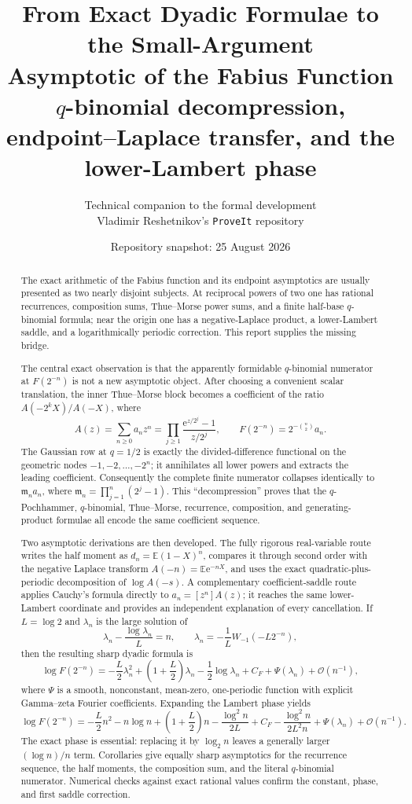 \documentclass[11pt,oneside]{article}
\title{\bfseries From Exact Dyadic Formulae to the Small-Argument\\
Asymptotic of the Fabius Function\\[0.35em]
\large $q$-binomial decompression, endpoint--Laplace transfer, and the lower-Lambert phase}
\author{Technical companion to the formal development\\
\small Vladimir Reshetnikov's \texttt{ProveIt} repository}
\date{Repository snapshot: 25 August 2026}
\theoremstyle{definition}
\theoremstyle{remark}
\newcommand{\e}{\mathrm e}
\newcommand{\E}{\mathbb E}
\newcommand{\bigO}{\mathcal O}
\newcommand{\M}{\mathfrak m}
\begin{document}
\maketitle

\begin{abstract}
The exact arithmetic of the Fabius function and its endpoint asymptotics are usually presented
as two nearly disjoint subjects.  At reciprocal powers of two one has rational recurrences,
composition sums, Thue--Morse power sums, and a finite half-base $q$-binomial formula; near the
origin one has a negative-Laplace product, a lower-Lambert saddle, and a logarithmically
periodic correction.  This report supplies the missing bridge.

The central exact observation is that the apparently formidable $q$-binomial numerator at
$F(2^{-n})$ is not a new asymptotic object.  After choosing a convenient scalar translation,
the inner Thue--Morse block becomes a coefficient of the ratio
$A(-2^kX)/A(-X)$, where
\[
 A(z)=\sum_{n\ge0}a_nz^n
     =\prod_{j\ge1}\frac{\e^{z/2^j}-1}{z/2^j},
 \qquad
 F(2^{-n})=2^{-\binom n2}a_n.
\]
The Gaussian row at $q=1/2$ is exactly the divided-difference functional on the geometric
nodes $-1,-2,\ldots,-2^n$; it annihilates all lower powers and extracts the leading
coefficient.  Consequently the complete finite numerator collapses identically to
$\M_na_n$, where $\M_n=\prod_{j=1}^n(2^j-1)$.  This ``decompression'' proves that the
$q$-Pochhammer, $q$-binomial, Thue--Morse, recurrence, composition, and generating-product
formulae all encode the same coefficient sequence.

Two asymptotic derivations are then developed.  The fully rigorous real-variable route writes
the half moment as $d_n=\E(1-X)^n$, compares it through second order with the negative
Laplace transform $A(-n)=\E\e^{-nX}$, and uses the exact quadratic-plus-periodic
decomposition of $\log A(-s)$.  A complementary coefficient-saddle route applies Cauchy's
formula directly to $a_n=[z^n]A(z)$; it reaches the same lower-Lambert coordinate and provides
an independent explanation of every cancellation.  If $L=\log2$ and $\lambda_n$ is the
large solution of
\[
 \lambda_n-\frac{\log\lambda_n}{L}=n,
 \qquad
 \lambda_n=-\frac1L W_{-1}(-L2^{-n}),
\]
then the resulting sharp dyadic formula is
\[
 \log F(2^{-n})=
 -\frac L2\lambda_n^2+
 \left(1+\frac L2\right)\lambda_n-\frac12\log\lambda_n
 +C_F+\Psi(\lambda_n)+\bigO(n^{-1}),
\]
where $\Psi$ is a smooth, nonconstant, mean-zero, one-periodic function with explicit
Gamma--zeta Fourier coefficients.  Expanding the Lambert phase yields
\[
 \log F(2^{-n})=
 -\frac L2n^2-n\log n+\left(1+\frac L2\right)n
 -\frac{\log^2n}{2L}+C_F-
 \frac{\log^2n}{2L^2n}+\Psi(\lambda_n)+\bigO(n^{-1}).
\]
The exact phase is essential: replacing it by $\log_2n$ leaves a generally larger
$(\log n)/n$ term.  Corollaries give equally sharp asymptotics for the recurrence sequence,
the half moments, the composition sum, and the literal $q$-binomial numerator.  Numerical
checks against exact rational values confirm the constant, phase, and first saddle
correction.
\end{abstract}
\end{document}
